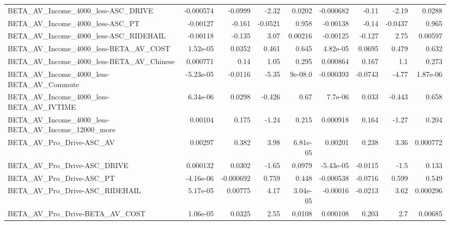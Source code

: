 \begin{tabular}{lrrrrrrrr}
BETA\_AV\_Income\_4000\_less-ASC\_DRIVE                 &   -0.000574 &      -0.0999 &     -2.32 &   0.0202 &  -0.000682 &       -0.11 &        -2.19 &        0.0288 \\
BETA\_AV\_Income\_4000\_less-ASC\_PT                    &    -0.00127 &       -0.161 &   -0.0521 &    0.958 &   -0.00138 &       -0.14 &      -0.0437 &         0.965 \\
BETA\_AV\_Income\_4000\_less-ASC\_RIDEHAIL              &    -0.00118 &       -0.135 &      3.07 &  0.00216 &   -0.00125 &      -0.127 &         2.75 &       0.00597 \\
BETA\_AV\_Income\_4000\_less-BETA\_AV\_COST              &    1.52e-05 &       0.0352 &     0.461 &    0.645 &   4.82e-05 &      0.0695 &        0.479 &         0.632 \\
BETA\_AV\_Income\_4000\_less-BETA\_AV\_Chinese           &    0.000771 &         0.14 &      1.05 &    0.295 &   0.000864 &       0.167 &          1.1 &         0.273 \\
BETA\_AV\_Income\_4000\_less-BETA\_AV\_Commute           &   -5.23e-05 &      -0.0116 &     -5.35 &  9e-08.0 &  -0.000393 &     -0.0743 &        -4.77 &      1.87e-06 \\
BETA\_AV\_Income\_4000\_less-BETA\_AV\_IVTIME            &    6.34e-06 &       0.0298 &    -0.426 &     0.67 &    7.7e-06 &       0.033 &       -0.443 &         0.658 \\
BETA\_AV\_Income\_4000\_less-BETA\_AV\_Income\_12000\_more &     0.00104 &        0.175 &     -1.24 &    0.215 &   0.000918 &       0.164 &        -1.27 &         0.204 \\
BETA\_AV\_Pro\_Drive-ASC\_AV                           &     0.00297 &        0.382 &      3.98 & 6.81e-05 &    0.00201 &       0.238 &         3.36 &      0.000772 \\
BETA\_AV\_Pro\_Drive-ASC\_DRIVE                        &    0.000132 &       0.0302 &     -1.65 &   0.0979 &  -5.43e-05 &     -0.0115 &         -1.5 &         0.133 \\
BETA\_AV\_Pro\_Drive-ASC\_PT                           &   -4.16e-06 &    -0.000692 &     0.759 &    0.448 &  -0.000538 &     -0.0716 &        0.599 &         0.549 \\
BETA\_AV\_Pro\_Drive-ASC\_RIDEHAIL                     &    5.17e-05 &      0.00775 &      4.17 & 3.04e-05 &   -0.00016 &     -0.0213 &         3.62 &      0.000296 \\
BETA\_AV\_Pro\_Drive-BETA\_AV\_COST                     &    1.06e-05 &       0.0325 &      2.55 &   0.0108 &   0.000108 &       0.203 &          2.7 &       0.00685 \\

\end{tabular}
